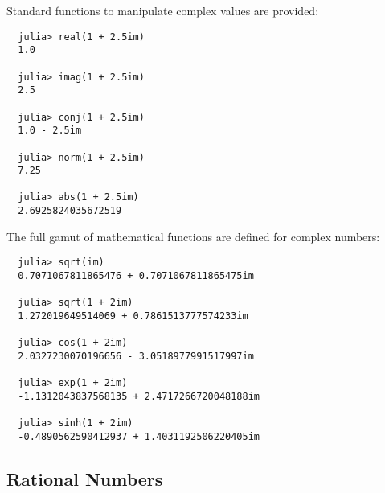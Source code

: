 \documentclass{article}
\begin{document}
Standard functions to manipulate complex values are provided:
\begin{verbatim}
  julia> real(1 + 2.5im)
  1.0

  julia> imag(1 + 2.5im)
  2.5

  julia> conj(1 + 2.5im)
  1.0 - 2.5im

  julia> norm(1 + 2.5im)
  7.25

  julia> abs(1 + 2.5im)
  2.6925824035672519
\end{verbatim}
The full gamut of mathematical functions are defined for complex numbers:
\begin{verbatim}
  julia> sqrt(im)
  0.7071067811865476 + 0.7071067811865475im

  julia> sqrt(1 + 2im)
  1.272019649514069 + 0.7861513777574233im

  julia> cos(1 + 2im)
  2.0327230070196656 - 3.0518977991517997im

  julia> exp(1 + 2im)
  -1.1312043837568135 + 2.4717266720048188im

  julia> sinh(1 + 2im)
  -0.4890562590412937 + 1.4031192506220405im
\end{verbatim}

\subsection{Rational Numbers}
\end{document}
